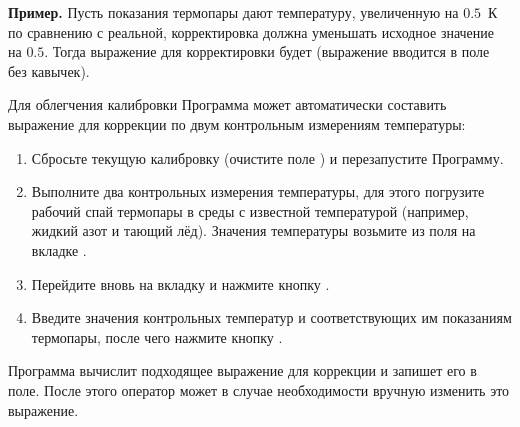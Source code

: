 {\bf Пример. } Пусть показания термопары дают температуру, увеличенную на $0.5$~К по сравнению с реальной, корректировка должна уменьшать исходное значение на $0.5$. Тогда выражение для корректировки будет \mbox{} (выражение вводится в поле без кавычек).

\bigskip

Для облегчения калибровки Программа может автоматически составить выражение для коррекции по двум контрольным измерениям температуры:

\begin{enumerate}
\item Сбросьте текущую калибровку (очистите поле ) и перезапустите Программу.
\item Выполните два контрольных измерения температуры, для этого погрузите рабочий спай термопары в среды с известной температурой (например, жидкий азот и тающий лёд). Значения температуры возьмите из поля  на вкладке .
\item Перейдите вновь на вкладку  и нажмите кнопку .
\item Введите значения контрольных температур и соответствующих им показаниям термопары, после чего нажмите кнопку .
\end{enumerate}

Программа вычислит подходящее выражение для коррекции и запишет его в поле. После этого оператор может в случае необходимости вручную изменить это выражение.